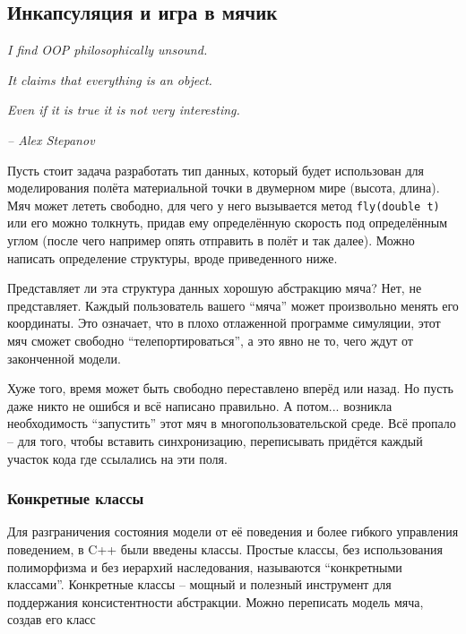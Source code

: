 \documentclass[a4paper,12pt,oneside]{article}
\newif\ifanswers
\begin{document}
\ifanswers
Правильный ответ: да, через явное приведение типов. Но лучше так не делать, это UB.
\fi

\pagebreak
\subsection{Инкапсуляция и игра в мячик}\label{Encapsulation}

\hfill\textit{I find OOP philosophically unsound.}

\hfill\textit{It claims that everything is an object.}

\hfill\textit{Even if it is true it is not very interesting.} {\vspace{0.5em}}

\hfill\textit{-- Alex Stepanov}

Пусть стоит задача разработать тип данных, который будет использован для моделирования полёта материальной точки в двумерном мире (высота, длина). Мяч может лететь свободно, для чего у него вызывается метод \lstinline!fly(double t)! или его можно толкнуть, придав ему определённую скорость под определённым углом (после чего например опять отправить в полёт и так далее). Можно написать определение структуры, вроде приведенного ниже.



Представляет ли эта структура данных хорошую абстракцию мяча? Нет, не представляет. Каждый пользователь вашего ``мяча'' может произвольно менять его координаты. Это означает, что в плохо отлаженной программе симуляции, этот мяч сможет свободно ``телепортироваться'', а это явно не то, чего ждут от законченной модели. 



Хуже того, время может быть свободно переставлено вперёд или назад. Но пусть даже никто не ошибся и всё написано правильно. А потом... возникла необходимость ``запустить'' этот мяч в многопользовательской среде. Всё пропало – для того, чтобы вставить синхронизацию, переписывать придётся каждый участок кода где ссылались на эти поля.

\subsubsection{Конкретные классы}\label{ConcreteClasses}

Для разграничения состояния модели от её поведения и более гибкого управления поведением, в C++ были введены классы. Простые классы, без использования полиморфизма и без иерархий наследования, называются ``конкретными классами''. Конкретные классы -- мощный и полезный инструмент для поддержания консистентности абстракции. Можно переписать модель мяча, создав его класс
\end{document}

